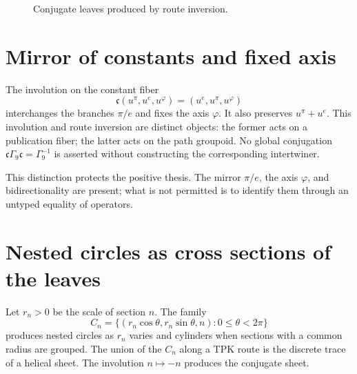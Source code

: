\begin{figure}[htbp]
\centering
{}
\caption{Conjugate leaves produced by route inversion.}
\label{espiral:fig:hojas-conjugadas}
\end{figure}

\section{Mirror of constants and fixed axis}

The involution on the constant fiber
\[
 \mathfrak c(u^\pi,u^e,u^\varphi)
 =(u^e,u^\pi,u^\varphi)
\]
interchanges the branches \(\pi/e\) and fixes the axis \(\varphi\). It also preserves \(u^\pi+u^e\). This involution and route inversion are distinct objects: the former acts on a publication fiber; the latter acts on the path groupoid. No global conjugation \(\mathfrak c\Gamma_9\mathfrak c=\Gamma_9^{-1}\) is asserted without constructing the corresponding intertwiner.

This distinction protects the positive thesis. The mirror \(\pi/e\), the axis
\(\varphi\), and bidirectionality are present; what is not permitted is
to identify them through an untyped equality of operators.

\section{Nested circles as cross sections of the leaves}

Let \(r_n>0\) be the scale of section \(n\). The family
\[
 C_n=\{(r_n\cos\theta,r_n\sin\theta,n):0\le\theta<2\pi\}
\]
produces nested circles as \(r_n\) varies and cylinders when
sections with a common radius are grouped. The union of the \(C_n\) along a TPK
route is the discrete trace of a helical sheet. The involution
\(n\mapsto-n\) produces the conjugate sheet.
